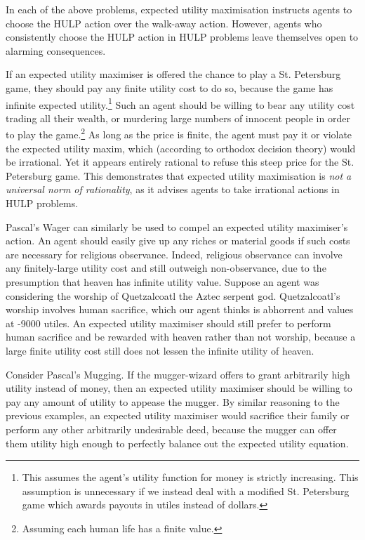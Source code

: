 \documentclass{article}
\begin{document}
In each of the above problems, expected utility maximisation instructs agents to choose the HULP action over the walk-away action. However, agents who consistently choose the HULP action in HULP problems leave themselves open to alarming consequences.

If an expected utility maximiser is offered the chance to play a St. Petersburg game, they should pay any finite utility cost to do so, because the game has infinite expected utility.\footnote{This assumes the agent's utility function for money is strictly increasing. This assumption is unnecessary if we instead deal with a modified St. Petersburg game which awards payouts in utiles instead of dollars.} Such an agent should be willing to bear any utility cost \textemdash{} trading all their wealth, or murdering large numbers of innocent people \textemdash{} in order to play the game.\footnote{Assuming each human life has a finite value.} As long as the price is finite, the agent must pay it or violate the expected utility maxim, which (according to orthodox decision theory) would be irrational. Yet it appears entirely rational to refuse this steep price for the St. Petersburg game. This demonstrates that expected utility maximisation is \textit{not a universal norm of rationality}, as it advises agents to take irrational actions in HULP problems.

Pascal's Wager can similarly be used to compel an expected utility maximiser's action. An agent should easily give up any riches or material goods if such costs are necessary for religious observance. Indeed, religious observance can involve any finitely-large utility cost and still outweigh non-observance, due to the presumption that heaven has infinite utility value. Suppose an agent was considering the worship of Quetzalcoatl the Aztec serpent god. Quetzalcoatl's worship involves human sacrifice, which our agent thinks is abhorrent and values at -9000 utiles. An expected utility maximiser should still prefer to perform human sacrifice and be rewarded with heaven rather than not worship, because a large finite utility cost still does not lessen the infinite utility of heaven. 

Consider Pascal's Mugging. If the mugger-wizard offers to grant arbitrarily high utility instead of money, then an expected utility maximiser should be willing to pay any amount of utility to appease the mugger. By similar reasoning to the previous examples, an expected utility maximiser would sacrifice their family or perform any other arbitrarily undesirable deed, because the mugger can offer them utility high enough to perfectly balance out the expected utility equation.
\end{document}

